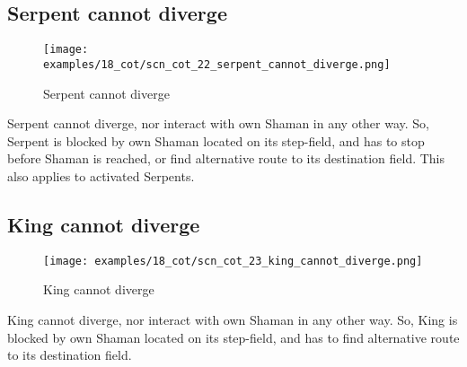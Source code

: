 \subsection*{Serpent cannot diverge}
\label{sec:Conquest of Tlalocan/Divergence/Serpent cannot diverge}

\vspace*{-1.4\baselineskip}
\noindent
\begin{figure}[!h]
\texttt{[image: examples/18\_cot/scn\_cot\_22\_serpent\_cannot\_diverge.png]}
\vspace*{-1.3\baselineskip}
\caption{Serpent cannot diverge}
\label{fig:scn_cot_22_serpent_cannot_diverge}
\end{figure}

\vspace*{-0.5\baselineskip}
Serpent cannot diverge, nor interact with own Shaman in any other way. So, Serpent
is blocked by own Shaman located on its step-field, and has to stop before Shaman
is reached, or find alternative route to its destination field. This also applies
to activated Serpents.


\subsection*{King cannot diverge}
\label{sec:Conquest of Tlalocan/Divergence/King cannot diverge}

\noindent
\begin{wrapfigure}[6]{l}{0.4\textwidth}
\centering
\texttt{[image: examples/18\_cot/scn\_cot\_23\_king\_cannot\_diverge.png]}
\caption{King cannot diverge}
\label{fig:scn_cot_23_king_cannot_diverge}
\end{wrapfigure}
King cannot diverge, nor interact with own Shaman in any other way. So, King is
blocked by own Shaman located on its step-field, and has to find alternative
route to its destination field.

\clearpage %

